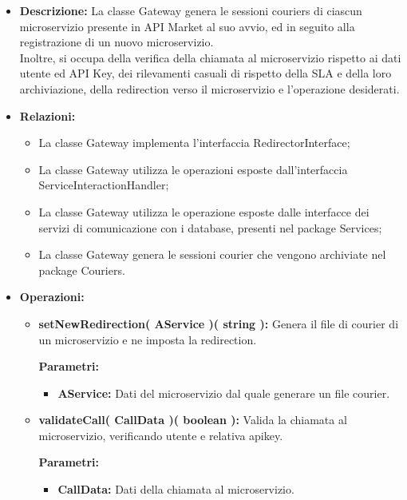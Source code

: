 \begin{itemize}
	\item \textbf{Descrizione:} La classe Gateway genera le sessioni couriers di ciascun microservizio presente in API Market al suo avvio, ed in seguito alla registrazione di un nuovo microservizio.\\
	Inoltre, si occupa della verifica della chiamata al microservizio rispetto ai dati utente ed API Key, dei rilevamenti casuali di rispetto della SLA e della loro archiviazione, della redirection verso il microservizio e l'operazione desiderati.
	\item \textbf{Relazioni:}
		\begin{itemize}
			\item La classe Gateway implementa l'interfaccia RedirectorInterface;
			\item La classe Gateway utilizza le operazioni esposte dall'interfaccia ServiceInteractionHandler;
			\item La classe Gateway utilizza le operazione esposte dalle interfacce dei servizi di comunicazione con i database, presenti nel package Services;
			\item La classe Gateway genera le sessioni courier che vengono archiviate nel package Couriers.
		\end{itemize}
	\item \textbf{Operazioni:}
		\begin{itemize}
			\item \textbf{setNewRedirection( AService )( string ):} Genera il file di courier di un microservizio e ne imposta la redirection.
				\begin{description}
    				\item[\textbf{Parametri:}]
				\end{description}
				\begin{itemize}
					\item \textbf{AService:} Dati del microservizio dal quale generare un file courier. 
				\end{itemize}
			\item \textbf{validateCall( CallData )( boolean ):} Valida la chiamata al microservizio, verificando utente e relativa apikey. 
				\begin{description}
    				\item[\textbf{Parametri:}]
				\end{description}
				\begin{itemize}
					\item \textbf{CallData:} Dati della chiamata al microservizio.

\end{itemize}
\end{itemize}
\end{itemize}
